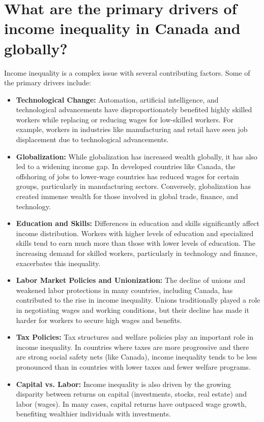 \documentclass{article}
\begin{document}
\section{What are the primary drivers of income inequality in Canada and globally?}

Income inequality is a complex issue with several contributing factors. Some of the primary drivers include:

\begin{itemize}
    \item \textbf{Technological Change:} Automation, artificial intelligence, and technological advancements have disproportionately benefited highly skilled workers while replacing or reducing wages for low-skilled workers. For example, workers in industries like manufacturing and retail have seen job displacement due to technological advancements.
    
    \item \textbf{Globalization:} While globalization has increased wealth globally, it has also led to a widening income gap. In developed countries like Canada, the offshoring of jobs to lower-wage countries has reduced wages for certain groups, particularly in manufacturing sectors. Conversely, globalization has created immense wealth for those involved in global trade, finance, and technology.
    
    \item \textbf{Education and Skills:} Differences in education and skills significantly affect income distribution. Workers with higher levels of education and specialized skills tend to earn much more than those with lower levels of education. The increasing demand for skilled workers, particularly in technology and finance, exacerbates this inequality.
    
    \item \textbf{Labor Market Policies and Unionization:} The decline of unions and weakened labor protections in many countries, including Canada, has contributed to the rise in income inequality. Unions traditionally played a role in negotiating wages and working conditions, but their decline has made it harder for workers to secure high wages and benefits.
    
    \item \textbf{Tax Policies:} Tax structures and welfare policies play an important role in income inequality. In countries where taxes are more progressive and there are strong social safety nets (like Canada), income inequality tends to be less pronounced than in countries with lower taxes and fewer welfare programs.
    
    \item \textbf{Capital vs. Labor:} Income inequality is also driven by the growing disparity between returns on capital (investments, stocks, real estate) and labor (wages). In many cases, capital returns have outpaced wage growth, benefiting wealthier individuals with investments.
\end{itemize}
\end{document}

